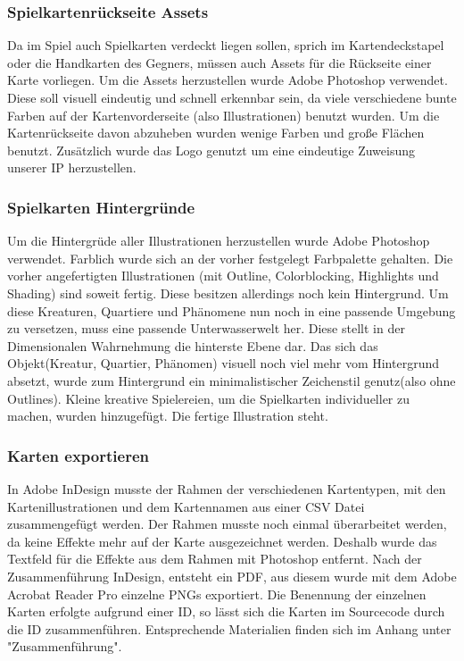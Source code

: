 \subsubsection{Spielkartenrückseite Assets}
Da im Spiel auch Spielkarten verdeckt liegen sollen, sprich im Kartendeckstapel oder die Handkarten des Gegners, müssen auch Assets für die Rückseite einer Karte vorliegen. Um die Assets herzustellen wurde Adobe Photoshop verwendet. Diese soll visuell eindeutig und schnell erkennbar sein, da viele verschiedene bunte Farben auf der Kartenvorderseite (also Illustrationen) benutzt wurden. Um die Kartenrückseite davon abzuheben wurden wenige Farben und große Flächen benutzt. Zusätzlich wurde das Logo genutzt um eine eindeutige Zuweisung unserer IP herzustellen.

\subsubsection{Spielkarten Hintergründe}
Um die Hintergrüde aller Illustrationen herzustellen wurde Adobe Photoshop verwendet. Farblich wurde sich an der vorher festgelegt Farbpalette gehalten. Die vorher angefertigten Illustrationen (mit Outline, Colorblocking, Highlights und Shading) sind soweit fertig. Diese besitzen allerdings noch kein Hintergrund. Um diese Kreaturen, Quartiere und Phänomene nun noch in eine passende Umgebung zu versetzen, muss eine passende Unterwasserwelt her. Diese stellt in der Dimensionalen Wahrnehmung die hinterste Ebene dar. Das sich das Objekt(Kreatur, Quartier, Phänomen) visuell noch viel mehr vom Hintergrund absetzt, wurde zum Hintergrund ein minimalistischer Zeichenstil genutz(also ohne Outlines). Kleine kreative Spielereien, um die Spielkarten individueller zu machen, wurden hinzugefügt. Die fertige Illustration steht.

\subsubsection{Karten exportieren}
In Adobe InDesign musste der Rahmen der verschiedenen Kartentypen, mit den Kartenillustrationen und dem Kartennamen aus einer CSV Datei zusammengefügt werden. 
Der Rahmen musste noch einmal überarbeitet werden, da keine Effekte mehr auf der Karte ausgezeichnet werden. Deshalb wurde das Textfeld für die Effekte aus dem Rahmen mit Photoshop entfernt. Nach der Zusammenführung InDesign, entsteht ein PDF, aus diesem wurde mit dem Adobe Acrobat Reader Pro einzelne PNGs exportiert. Die Benennung der einzelnen Karten erfolgte aufgrund einer ID, so lässt sich die Karten im Sourcecode durch die ID zusammenführen.
Entsprechende Materialien finden sich im Anhang unter "Zusammenführung".

